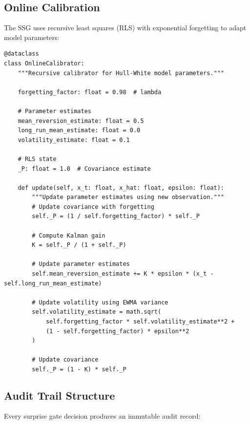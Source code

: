 \subsection{Online Calibration}

The SSG uses recursive least squares (RLS) with exponential forgetting to adapt model parameters:

\begin{lstlisting}[language=jsonx,caption={Online calibrator for Hull-White parameters}]
@dataclass
class OnlineCalibrator:
    """Recursive calibrator for Hull-White model parameters."""
    
    forgetting_factor: float = 0.98  # lambda
    
    # Parameter estimates
    mean_reversion_estimate: float = 0.5
    long_run_mean_estimate: float = 0.0
    volatility_estimate: float = 0.1
    
    # RLS state
    _P: float = 1.0  # Covariance estimate
    
    def update(self, x_t: float, x_hat: float, epsilon: float):
        """Update parameter estimates using new observation."""
        # Update covariance with forgetting
        self._P = (1 / self.forgetting_factor) * self._P
        
        # Compute Kalman gain
        K = self._P / (1 + self._P)
        
        # Update parameter estimates
        self.mean_reversion_estimate += K * epsilon * (x_t - self.long_run_mean_estimate)
        
        # Update volatility using EWMA variance
        self.volatility_estimate = math.sqrt(
            self.forgetting_factor * self.volatility_estimate**2 +
            (1 - self.forgetting_factor) * epsilon**2
        )
        
        # Update covariance
        self._P = (1 - K) * self._P
\end{lstlisting}

\subsection{Audit Trail Structure}

Every surprise gate decision produces an immutable audit record:

